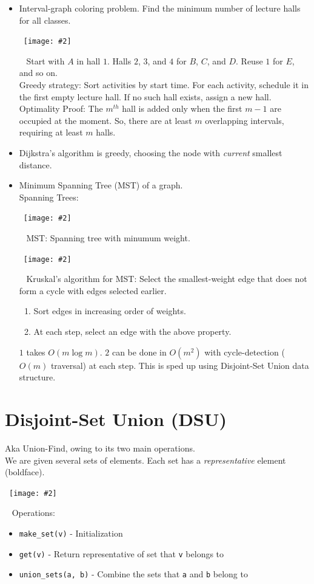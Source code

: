 \documentclass{article}
\newcommand{\I}[1]{\textit{#1}}
\newcommand{\T}[1]{\texttt{#1}}
\newcommand{\image}[2]{\
    \begin{center}\
        \texttt{[image: \#2]}\
    \end{center}\
}
\begin{document}
\begin{sloppypar}
\begin{itemize}
        \item Interval-graph coloring problem. Find the minimum number of lecture halls for all classes.
        \image{0.7}{../images/int-graph.png}
        Start with $A$ in hall $1$. Halls $2$, $3$, and $4$ for $B$, $C$, and $D$. Reuse $1$ for $E$, and so on.\\
        \noindent Greedy strategy: Sort activities by start time. For each activity, schedule it in the first empty lecture hall. If no such hall exists, assign a new hall.\\
        \noindent Optimality Proof: The $m^{th}$ hall is added only when the first $m-1$ are occupied at the moment. So, there are at least $m$ overlapping intervals, requiring at least $m$ halls.

        \item Dijkstra's algorithm is greedy, choosing the node with \I{current} smallest distance.

        \item Minimum Spanning Tree (MST) of a graph.\\
        \noindent Spanning Trees:
        \image{0.7}{../images/span-tree.png}
        \noindent MST: Spanning tree with minumum weight.
        \image{0.9}{../images/mst.png}
        \noindent Kruskal's algorithm for MST: Select the smallest-weight edge that does not form a cycle with edges selected earlier.
        \begin{enumerate}
            \item Sort edges in increasing order of weights.
            \item At each step, select an edge with the above property.
        \end{enumerate}
        $1$ takes $O(m\log m)$. $2$ can be done in $O(m^2)$ with cycle-detection ($O(m)$ traversal) at each step. This is sped up using Disjoint-Set Union data structure.
    \end{itemize}

    \newpage

    \section{Disjoint-Set Union (DSU)}
    Aka Union-Find, owing to its two main operations.\\
    We are given several sets of elements. Each set has a \I{representative} element (boldface).
    \image{0.5}{../images/dsu-1.png}
    Operations:
    \begin{itemize}
        \item \T{make\_set(v)} - Initialization
        \item \T{get(v)} - Return representative of set that \T{v} belongs to
        \item \T{union\_sets(a, b)} - Combine the sets that \T{a} and \T{b} belong to
    \end{itemize}


\end{sloppypar}
\end{document}
